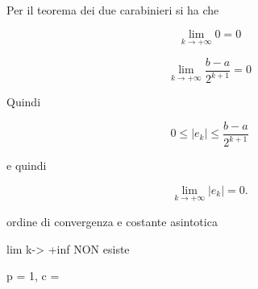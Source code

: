 \documentclass[a4paper, 11pt]{article}
\begin{document}
        Per il teorema dei due carabinieri si ha che 

        \[
        \lim_{k \to +\infty} 0 = 0
        \]

        \[
        \lim_{k \to +\infty} \frac{b-a}{2^{k+1}} = 0
        \]

        Quindi 

        \[
        0 \leq |e_k| \leq \frac{b-a}{2^{k+1}}
        \]

        e quindi 

        \[
        \lim_{k \to +\infty} |e_k| = 0.
        \]



        ordine di convergenza e costante asintotica

        lim k-> +inf  NON esiste

        p = 1, c = 
\end{document}
